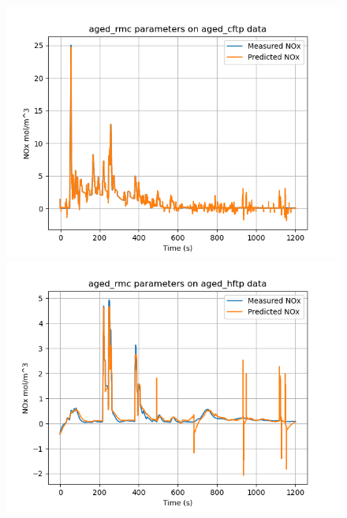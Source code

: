 \begin{figure}[H]
        \begin{minipage}{0.33\textwidth}
                \includegraphics[width = \textwidth]{./figs/figs_new_mdl/aged_rmc_aged_cftp.png}
        \end{minipage}
        \begin{minipage}{0.33\textwidth}
                \includegraphics[width = \textwidth]{./figs/figs_new_mdl/aged_rmc_aged_hftp.png}
        \end{minipage}
        \begin{minipage}{0.33\textwidth}

\end{minipage}
\end{figure}
